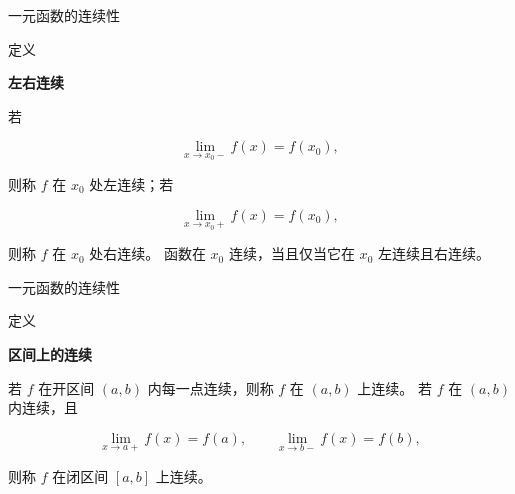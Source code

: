 \documentclass[aspectratio=169,10pt,fontset=fandol]{ctexbeamer}
\begin{document}
\begin{frame}[t,fragile]{一元函数的连续性}
\normalsize
\begin{block}{定义}
{\normalsize
\textbf{左右连续}\par


若

\[

\lim_{x\to x_0-}f(x)=f(x_0),

\]

则称 $f$ 在 $x_0$ 处左连续；若

\[

\lim_{x\to x_0+}f(x)=f(x_0),

\]

则称 $f$ 在 $x_0$ 处右连续。 函数在 $x_0$ 连续，当且仅当它在 $x_0$ 左连续且右连续。


}
\end{block}
\end{frame}
\begin{frame}[t,fragile]{一元函数的连续性}
\normalsize
\begin{block}{定义}
{\normalsize
\textbf{区间上的连续}\par


若 $f$ 在开区间 $(a,b)$ 内每一点连续，则称 $f$ 在 $(a,b)$ 上连续。 若 $f$ 在 $(a,b)$ 内连续，且

\[

\lim_{x\to a+}f(x)=f(a),\qquad \lim_{x\to b-}f(x)=f(b),

\]

则称 $f$ 在闭区间 $[a,b]$ 上连续。


}
\end{block}
\end{frame}
\end{document}
